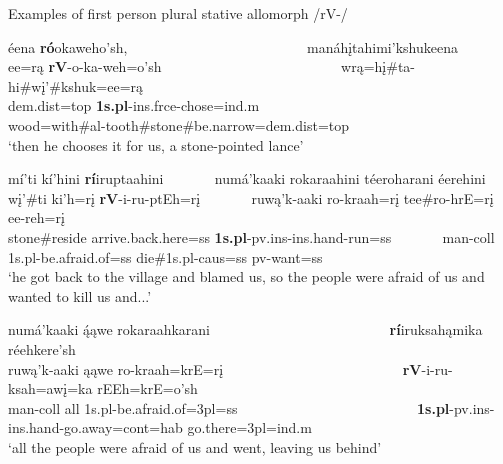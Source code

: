 \begin{exe}
\item\label{ExRVS} Examples of first person plural stative allomorph /rV-/

	\begin{xlist}
	
	\item \glll éena \textbf{ró}okaweho'sh, ~ ~ ~ ~ ~ ~ ~ ~ ~ ~ ~ ~ ~ ~ ~ manáhįtahimi'kshukeena\\
	ee=rą \textbf{rV}-o-ka-weh=o'sh ~ ~ ~ ~ ~ ~ ~ ~ ~ ~ ~ ~ ~ ~ ~  wrą=hį\#ta-hi\#wį'\#kshuk=ee=rą\\
	dem.dist=top \textbf{1s.pl}-ins.frce-\textnormal{chose}=ind.m ~ ~ ~ ~ ~ ~ ~ ~ ~ ~ ~ ~ ~ ~ ~  \textnormal{wood}=\textnormal{with}\#al-\textnormal{tooth}\#\textnormal{stone}\#\textnormal{be.narrow}=dem.dist=top\\
	\glt `then he chooses it for us, a stone-pointed lance' \citep[151]{hollow1973b}
	
	\item \glll mí'ti kí'hini \textbf{rí}iruptaahini ~ ~ ~ ~ numá'kaaki rokaraahini téeroharani éerehini\\
	wį'\#ti ki'h=rį \textbf{rV}-i-ru-ptEh=rį ~ ~ ~ ~  ruwą'k-aaki ro-kraah=rį tee\#ro-hrE=rį ee-reh=rį\\
	\textnormal{stone}\#\textnormal{reside} \textnormal{arrive.back.here}=ss \textbf{1s.pl}-pv.ins-ins.hand-\textnormal{run}=ss ~ ~ ~ ~ \textnormal{man}-coll 1s.pl-\textnormal{be.afraid.of}=ss \textnormal{die}\#1s.pl-caus=ss pv-\textnormal{want}=ss\\
	\glt `he got back to the village and blamed us, so the people were afraid of us and wanted to kill us and...' \citep[186]{hollow1973a}
	
	\item \glll numá'kaaki ą́ąwe rokaraahkarani ~ ~ ~ ~ ~ ~ ~ ~ ~ ~ ~ ~ ~ ~ ~ \textbf{rí}iruksahąmika réehkere'sh\\
	ruwą'k-aaki ąąwe ro-kraah=krE=rį ~ ~ ~ ~ ~ ~ ~ ~ ~ ~ ~ ~ ~ ~ ~ \textbf{rV}-i-ru-ksah=awį=ka rEEh=krE=o'sh\\
	\textnormal{man}-coll \textnormal{all} 1s.pl-\textnormal{be.afraid.of}=3pl=ss ~ ~ ~ ~ ~ ~ ~ ~ ~ ~ ~ ~ ~ ~ ~ \textbf{1s.pl}-pv.ins-ins.hand-\textnormal{go.away}=cont=hab \textnormal{go.there}=3pl=ind.m\\
	\glt `all the people were afraid of us and went, leaving us behind' \citep[184]{hollow1973a}
	
	\end{xlist}

\end{exe}

